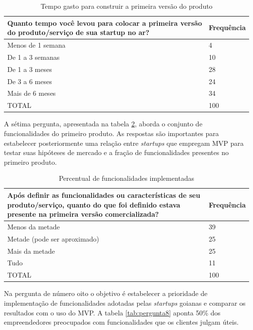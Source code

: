 \begin{table}[hb]
\centering
\caption{Tempo gasto para construir a primeira vers\~ao do produto}
\label{tab:pergunta6}
\begin{tabular}{|p{10cm}|p{2cm}|}
\hline{\bf Quanto tempo voc\^e levou para colocar a primeira vers\~ao do produto/servi\c{c}o de sua startup no ar?} & {\bf Frequ\^encia}\\
\hline Menos de 1 semana & 4\\
\hline De 1 a 3 semanas & 10\\
\hline De 1 a 3 meses & 28\\
\hline De 3 a 6 meses & 24\\
\hline Mais de 6 meses & 34\\
\hline TOTAL & 100\\
\hline
\end{tabular}
\end{table}

A s\'etima pergunta, apresentada na tabela \ref{tab:pergunta7}, aborda o conjunto de funcionalidades do primeiro produto. As respostas s\~ao importantes para estabelecer posteriormente uma rela\c{c}\~ao entre \emph{startups} que empregam MVP para testar suas hip\'oteses de mercado e a fra\c{c}\~ao de funcionalidades presentes no primeiro produto.

\begin{table}[hb]
\centering
\caption{Percentual de funcionalidades implementadas}
\label{tab:pergunta7}
\begin{tabular}{|p{10cm}|p{2cm}|}
\hline{\bf Ap\'os definir as funcionalidades ou caracter\'isticas de seu produto/servi\c{c}o, quanto do que foi definido estava presente na primeira vers\~ao comercializada?} & {\bf Frequ\^encia}\\
\hline Menos da metade & 39\\
\hline Metade (pode ser aproximado) & 25\\
\hline Mais da metade & 25\\
\hline Tudo & 11\\
\hline TOTAL & 100\\
\hline
\end{tabular}
\end{table}

\pagebreak

Na pergunta de n\'umero oito o objetivo \'e estabelecer a prioridade de implementa\c{c}\~ao de funcionalidades adotadas pelas \emph{startups} goianas e comparar os resultados com o uso do MVP. A tabela \ref{tab:pergunta8} aponta 50\% dos empreendedores preocupados com funcionalidades que os clientes julgam \'uteis.

